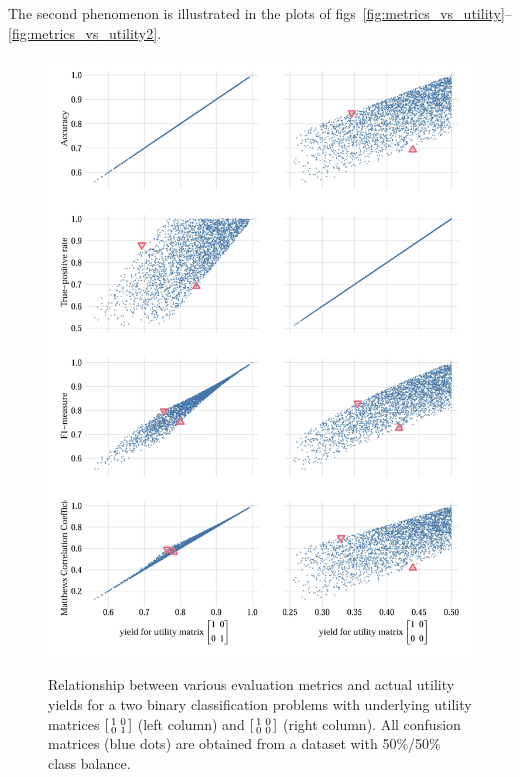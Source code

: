 \documentclass[\ifafour a4paper,12pt,\else a5paper,10pt,\fi%
onecolumn,oneside,article,%
british%
]{memoir}
\theoremstyle{remark}
\theoremstyle{innote}
\renewcommand*{\|}[1][]{\nonscript\:#1\vert\nonscript\:\mathopen{}}
\newcommand*{\figs}{figs}%
\begin{document}
The second phenomenon is illustrated in the plots of \figs~\ref{fig:metrics_vs_utility}--\ref{fig:metrics_vs_utility2}.
\begin{figure}[p]
  \centering
\includegraphics[width=0.95\linewidth]{utility_vs_metrics2_0.5.jpg}\\%
\caption{Relationship between various evaluation metrics and actual utility yields for a  two binary classification problems with underlying utility matrices $\begin{bsmallmatrix} 1&0\\0&1 \end{bsmallmatrix}$ (left column) and $\begin{bsmallmatrix} 1&0\\0&0 \end{bsmallmatrix}$ (right column). All confusion matrices ({\color{mypurpleblue}blue dots}) are obtained from a dataset with 50\%/50\% class balance.
}
\end{figure}
\end{document}
